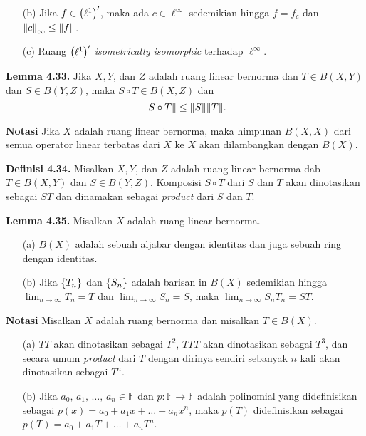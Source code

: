 \documentclass{article}
\newcommand{\Lim}{\lim_{n  \to \infty}}
\begin{document}
\begin{multicols}{2}
\begin{itemize}
    \item[(b)] Jika \(f \in \qty(\ell^1)'\), maka ada \(c\in \ell^\infty\) sedemikian hingga \(f=f_c\) dan \(\norm{c}_\infty \leq \norm{f}\).

    \item[(c)] Ruang \(\qty(\ell^1)'\) \textit{isometrically isomorphic} terhadap \(\ell^\infty\).
  \end{itemize}

  \textbf{Lemma 4.33.} Jika \(X, Y\), dan \(Z\) adalah ruang linear bernorma dan \(T \in B(X,Y)\) dan \(S\in B(Y,Z)\), maka \(S\circ T \in B(X,Z)\) dan
  \[\norm{S \circ T} \leq \norm{S}\norm{T}.\]

  \textbf{Notasi } Jika  $X$ adalah ruang linear bernorma, maka himpunan  $B(X, X)$  dari semua operator linear terbatas dari $X$ ke  $X$ akan dilambangkan dengan $B(X)$.

  \textbf{Definisi 4.34.} Misalkan \(X,Y\), dan \(Z\) adalah ruang linear bernorma dab \(T \in B(X,Y)\) dan \(S \in B(Y,Z)\). Komposisi \(S \circ T\) dari \(S\) dan \(T\) akan dinotasikan sebagai \(ST\) dan dinamakan sebagai \textit{product} dari \(S\) dan \(T\).

  \textbf{Lemma 4.35.} Misalkan \(X\) adalah ruang linear bernorma.
  \begin{itemize}
    \item[(a)] \(B(X)\) adalah sebuah aljabar dengan identitas dan juga sebuah ring dengan identitas.

    \item[(b)] Jika \(\qty{T_n}\) dan \(\qty{S_n}\) adalah barisan in \(B(X)\) sedemikian hingga \(\displaystyle \Lim T_n = T\) dan \(\displaystyle\Lim S_n = S\), maka \(\displaystyle\Lim S_nT_n = ST\).
  \end{itemize}

  \textbf{Notasi} Misalkan \(X\) adalah ruang bernorma dan misalkan \(T \in B(X)\).
  \begin{itemize}
    \item[(a)] \(TT\) akan dinotasikan sebagai \(T^2\), \(TTT\) akan dinotasikan sebagai \(T^3\), dan secara umum \textit{product} dari \(T\) dengan dirinya sendiri sebanyak \(n\) kali akan dinotasikan sebagai \(T^n\).

    \item[(b)] Jika \(a_0,\, a_1,\, \dots,\, a_n \in \mathbb{F}\) dan \(p: \mathbb{F} \to \mathbb{F}\) adalah polinomial yang didefinisikan sebagai \(p(x) = a_0 + a_1x + \dots + a_nx^n\), maka \(p(T)\) didefinisikan sebagai \(p(T) = a_0 + a_1T + \dots + a_nT^n\).
  \end{itemize}


\end{multicols}
\end{document}
